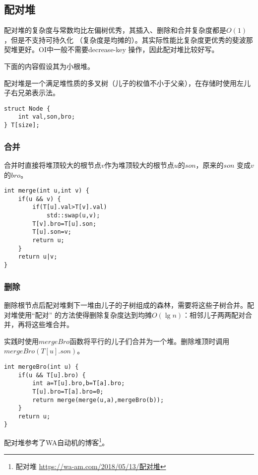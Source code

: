 \subsection{配对堆}
配对堆的复杂度与常数均比左偏树优秀，其插入、删除和合并复杂度都是$O(1)$，但是不支持可持久化
（复杂度是均摊的）。其实际性能比复杂度更优秀的斐波那契堆更好。OI中一般不需要decrease-key
操作，因此配对堆比较好写。

下面的内容假设其为小根堆。

配对堆是一个满足堆性质的多叉树（儿子的权值不小于父亲），在存储时使用左儿子右兄弟表示法。
\begin{lstlisting}
struct Node {
    int val,son,bro;
} T[size];
\end{lstlisting}
\subsubsection{合并}
合并时直接将堆顶较大的根节点$v$作为堆顶较大的根节点$u$的$son$，原来的$son$
变成$v$的$bro$。
\begin{lstlisting}
int merge(int u,int v) {
    if(u && v) {
        if(T[u].val>T[v].val)
            std::swap(u,v);
        T[v].bro=T[u].son;
        T[u].son=v;
        return u;
    }
    return u|v;
}
\end{lstlisting}
\subsubsection{删除}
删除根节点后配对堆剩下一堆由儿子的子树组成的森林，需要将这些子树合并。配对堆使用``配对''
的方法使得删除复杂度达到均摊$O(\lg n)$：相邻儿子两两配对合并，再将这些堆合并。

实践时使用$mergeBro$函数将平行的儿子们合并为一个堆。删除堆顶时调用$mergeBro(T[u].son)$。

\begin{lstlisting}
int mergeBro(int u) {
    if(u && T[u].bro) {
        int a=T[u].bro,b=T[a].bro;
        T[u].bro=T[a].bro=0;
        return merge(merge(u,a),mergeBro(b));
    }
    return u;
}
\end{lstlisting}

配对堆参考了WA自动机的博客\footnote{
    配对堆
    \url{https://wa-am.com/2018/05/13/配对堆}
}。
